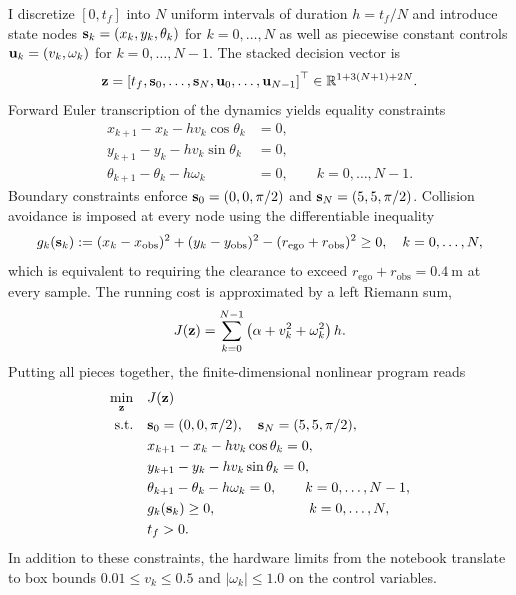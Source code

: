\documentclass [11pt]{article}
\begin{document}
\begin{enumerate}[label=(\roman*)]
        I discretize $[0,t_f]$ into $N$ uniform intervals of duration $h = t_f/N$ and introduce state nodes ${\bf s}_k = (x_k, y_k, \theta_k)$ for $k=0,\ldots,N$ as well as piecewise constant controls ${\bf u}_k = (v_k, \omega_k)$ for $k=0,\ldots,N-1$. The stacked decision vector is
        \[
            {\bf z} = \left[t_f,{\bf s}_0,\ldots,{\bf s}_N,{\bf u}_0,\ldots,{\bf u}_{N-1}\right]^\top \in \mathbb{R}^{1 + 3(N+1) + 2N}.
        \]
        Forward Euler transcription of the dynamics yields equality constraints
        \begin{align}
            x_{k+1} - x_k - h v_k \cos\theta_k &= 0, \\
            y_{k+1} - y_k - h v_k \sin\theta_k &= 0, \\
            \theta_{k+1} - \theta_k - h \omega_k &= 0, \qquad k = 0,\dots,N-1.
        \end{align}
        Boundary constraints enforce ${\bf s}_0 = (0,0,\pi/2)$ and ${\bf s}_N = (5,5,\pi/2)$. Collision avoidance is imposed at every node using the differentiable inequality
        \begin{equation}
            g_k({\bf s}_k) := (x_k - x_{\text{obs}})^2 + (y_k - y_{\text{obs}})^2 - (r_{\text{ego}} + r_{\text{obs}})^2 \ge 0,
            \quad k = 0,\ldots,N,
        \end{equation}
        which is equivalent to requiring the clearance to exceed $r_{\text{ego}} + r_{\text{obs}} = 0.4~\text{m}$ at every sample. The running cost is approximated by a left Riemann sum,
        \begin{equation}
            J({\bf z}) = \sum_{k=0}^{N-1} \left(\alpha + v_k^2 + \omega_k^2\right) h.
        \end{equation}
        Putting all pieces together, the finite-dimensional nonlinear program reads
        \begin{align}
            \min_{\bf z} \quad & J({\bf z}) \nonumber \\
            \text{s.t.}\quad & {\bf s}_0 = (0,0,\pi/2), \quad {\bf s}_N = (5,5,\pi/2), \nonumber \\
            & x_{k+1} - x_k - h v_k \cos\theta_k = 0, \nonumber \\
            & y_{k+1} - y_k - h v_k \sin\theta_k = 0, \\
            & \theta_{k+1} - \theta_k - h \omega_k = 0, \qquad k = 0,\ldots,N-1, \nonumber \\
            & g_k({\bf s}_k) \ge 0, \qquad\qquad\qquad\ \ k = 0,\ldots,N, \nonumber \\
            & t_f > 0. \nonumber
        \end{align}
        In addition to these constraints, the hardware limits from the notebook translate to box bounds $0.01 \le v_k \le 0.5$ and $|\omega_k| \le 1.0$ on the control variables.


\end{enumerate}
\end{document}
